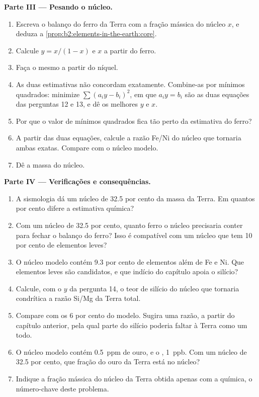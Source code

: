 \begin{problem}
\noindent\textbf{Parte III --- Pesando o núcleo.}
\begin{enumerate}[resume]
\item Escreva o balanço do ferro da Terra com a fração mássica do núcleo $x$, e
deduza a \cref{prop:b2:elements-in-the-earth:core}.
\item Calcule $y = x/(1-x)$ e $x$ a partir do ferro.
\item Faça o mesmo a partir do níquel.
\item As duas estimativas não concordam exatamente. Combine-as por mínimos quadrados:
minimize $\sum (a_iy - b_i)^2$, em que $a_i y = b_i$ são as duas equações das
perguntas 12 e 13, e dê os melhores $y$ e $x$.
\item Por que o valor de mínimos quadrados fica tão perto da estimativa do ferro?
\item A partir das duas equações, calcule a razão Fe/Ni do núcleo que tornaria
ambas exatas. Compare com o núcleo modelo.
\item Dê a massa do núcleo.
\end{enumerate}

\noindent\textbf{Parte IV --- Verificações e consequências.}
\begin{enumerate}[resume]
\item A sismologia dá um núcleo de 32.5 por cento da massa da Terra. Em quantos
por cento difere a estimativa química?
\item Com um núcleo de 32.5 por cento, quanto ferro o núcleo precisaria conter para
fechar o balanço do ferro? Isso é compatível com um núcleo que tem 10 por cento de elementos
leves?
\item O núcleo modelo contém 9.3 por cento de elementos além de Fe e Ni. Que
elementos leves são candidatos, e que indício do capítulo apoia o silício?
\item Calcule, com o $y$ da pergunta 14, o teor de silício do núcleo que tornaria
condrítica a razão Si/Mg da Terra total.
\item Compare com os 6 por cento do modelo. Sugira uma razão, a partir do capítulo
anterior, pela qual parte do silício poderia faltar à Terra como um todo.
\item O núcleo modelo contém \qty{0.5}{ppm} de ouro, e o ,
\qty{1}{ppb}. Com um núcleo de 32.5 por cento, que fração do ouro da Terra está
no núcleo?
\item Indique a fração mássica do núcleo da Terra obtida apenas com a química,
o número-chave deste problema.
\end{enumerate}
\end{problem}
